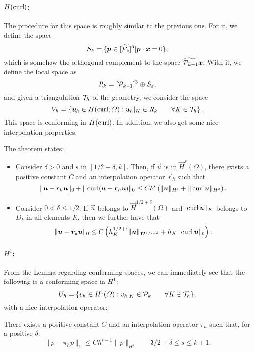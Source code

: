 \paragraph{$H(\curl)$:} The procedure for this space is roughly similar to the previous one. For it, we define the space
    \begin{equation*}
S_k = \{ \vec p \in [\widetilde{\P_k}]^3 | \vec p \cdot \vec x = 0 \},
\end{equation*}
which is somehow the orthogonal complement to the space $\widetilde{\P_{k-1}}\vec x$. With it, we define the local space as 
    \begin{equation*}
R_k = [\P_{k-1}]^3\oplus S_k,
\end{equation*}
and given a triangulation $\T_h$ of the geometry, we consider the space
    \begin{equation*}
V_h = \left\{ \vec u_h \in H(\curl;\Omega): \vec u_h|_K \in R_k\qquad \forall K\in \T_h\right\}.
\end{equation*}
This space is conforming in $H(\curl)$. In addition, we also get some nice interpolation properties. 
    \begin{theorem} The theorem states: 
        \begin{itemize}
            \item Consider $\delta>0$ and $s$ in $[1/2+\delta, k]$. Then, if $\vec u$ is in $\vec H^s(\Omega)$, there exists a positive constant $C$ and an interpolation operator $\vec r_h$ such that 
                \begin{equation*}
\| \vec u - \vec r_h \vec u\|_0 + \| \curl(\vec u - \vec r_h \vec u) \|_0 \leq C h^s \left(\| \vec u\|_{H^s} + \| \curl \vec u \|_{H^s}\right) .
\end{equation*}
            \item Consider $0<\delta\leq 1/2$. If $\vec u$ belongs to $\vec H^{1/2+\delta}(\Omega)$ and $[\curl \vec u]|_K$ belongs to $D_k$ in all elements $K$, then we further have that
                \begin{equation*}
\|\vec u - \vec r_h \vec u\|_0 \leq C\left(h_K^{1/2+\delta} \| \vec u\|_{\vec H^{1/2+\delta}} + h_K \| \curl \vec u\|_0 \right).
\end{equation*}
        \end{itemize}
    \end{theorem}
\paragraph{$H^1$:} From the Lemma regarding conforming spaces, we can immediately see that the following is a conforming space in $H^1$: 
    \begin{equation*}
U_h = \{ v_h \in H^1(\Omega): v_h|_K \in \P_k \qquad\forall K\in \T_h\},
\end{equation*}
with a nice interpolation operator:
    \begin{theorem}
        There exists a positive constant $C$ and an interpolation operator $\pi_h$ such that, for a positive $\delta$: 
         \begin{equation*}
\|p - \pi_h p \|_1 \leq C h^{s-1} \|p\|_{H^s} \qquad 3/2+\delta \leq s \leq k+1 .
\end{equation*}
    \end{theorem}

